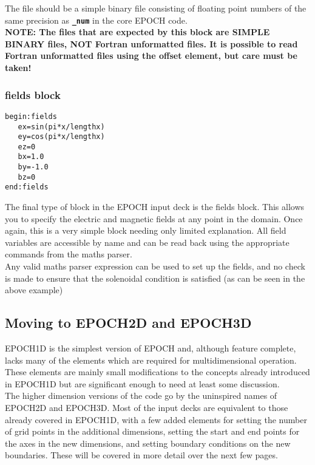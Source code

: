 \documentclass[12pt]{article}
\newcommand{\emphtext}{\color{warwickdark} \fontfamily{phv}\selectfont\Large\bf}
\newcommand{\inlineemph}{\color{warwicklight} \bf}
\newcommand{\boxverbatim}[1]{\begin{Verbatim}[obeytabs=true,frame=single,
  framerule=0.5mm,rulecolor=\color{warwickmid},label=#1]}
\newcommand{\inlinecode}[1]{{\color{warwickred} \bf\texttt{#1}}}
\newcommand{\EPOCH}{{\color{warwickdark}\fontfamily{phv}\selectfont EPOCH} }
\begin{document}
The file should be a simple binary file consisting of floating point numbers of
the same precision as \inlinecode{\_num} in the core \EPOCH code.\\

{ \emphtext NOTE: The files that are expected by this block are SIMPLE BINARY
files, NOT Fortran unformatted files. It is possible to read Fortran
unformatted files using the offset element, but care must be taken!}\\

\subsubsection{{\inlineemph fields} block}
\boxverbatim{fields block}
begin:fields
   ex=sin(pi*x/lengthx)
   ey=cos(pi*x/lengthx)
   ez=0
   bx=1.0
   by=-1.0
   bz=0
end:fields
\end{Verbatim}

The final type of block in the EPOCH input deck is the fields block. This
allows you to specify the electric and magnetic fields at any point in the
domain. Once again, this is a very simple block needing only limited
explanation. All field variables are accessible by name and can be read back
using the appropriate commands from the maths parser. \\

Any valid maths parser expression can be used to set up the fields, and no
check is made to ensure that the solenoidal condition is satisfied (as can be
seen in the above example)\\

\pagebreak

\subsection{Moving to EPOCH2D and EPOCH3D}
EPOCH1D is the simplest version of \EPOCH and, although feature complete, lacks
many of the elements which are required for multidimensional operation. These
elements are mainly small modifications to the concepts already introduced in
EPOCH1D but are significant enough to need at least some discussion.\\

The higher dimension versions of the code go by the uninspired names of EPOCH2D
and EPOCH3D. Most of the input decks are equivalent to those already covered in
EPOCH1D, with a few added elements for setting the number of grid points in the
additional dimensions, setting the start and end points for the axes in the new
dimensions, and setting boundary conditions on the new boundaries. These will
be covered in more detail over the next few pages.\\
\end{document}
